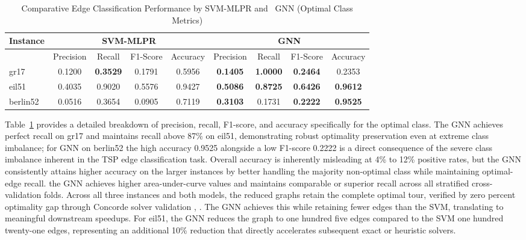 \documentclass[twoside]{article}
\begin{document}
	\begin{table}[htbp]
		\centering
		\caption{Comparative Edge Classification Performance by SVM-MLPR and \ GNN (Optimal Class Metrics)}
		\label{tab:optimal_metrics}
		\small
		\begin{tabular}{@{}l|cccc|cccc@{}}\hline
			\textbf{Instance} & \multicolumn{4}{c}{\textbf{SVM-MLPR}} & \multicolumn{4}{c}{\textbf{GNN}} \\ \hline
			& Precision & Recall & F1-Score & Accuracy & Precision & Recall & F1-Score & Accuracy \\
			gr17 & 0.1200 & \textbf{0.3529} & 0.1791 & 0.5956 & \textbf{0.1405} & \textbf{1.0000} & \textbf{0.2464} & 0.2353 \\
			eil51 & 0.4035 & 0.9020 & 0.5576 & 0.9427 & \textbf{0.5086} & \textbf{0.8725} & \textbf{0.6426} & \textbf{0.9612} \\
			berlin52 & 0.0516 & 0.3654 & 0.0905 & 0.7119 & \textbf{0.3103} & 0.1731 & \textbf{0.2222} & \textbf{0.9525} \\ \hline
		\end{tabular}
	\end{table}

	

		Table~\ref{tab:optimal_metrics} provides a detailed breakdown of precision, recall, F1-score, and accuracy specifically for the optimal class. The GNN achieves perfect recall on gr17 and maintains recall above 87\% on eil51, demonstrating robust optimality preservation even at extreme class imbalance; for GNN on berlin52 the high accuracy 0.9525 alongside a low F1-score 0.2222 is a direct consequence of the severe class imbalance inherent in the TSP edge classification task. Overall accuracy is inherently misleading at 4\% to 12\% positive rates, but the GNN consistently attains higher accuracy on the larger instances by better handling the majority non-optimal class while maintaining optimal-edge recall.  the GNN achieves higher area-under-curve values and maintains comparable or superior recall across all stratified cross-validation folds. Across all three instances and both models, the reduced graphs retain the complete optimal tour, verified by zero percent optimality gap through Concorde solver validation \cite{applegate2006traveling},  \cite{applegate2006concorde}. The GNN achieves this while retaining fewer edges than the SVM, translating to meaningful downstream speedups. For eil51, the GNN reduces the graph to one hundred five edges compared to the SVM one hundred twenty-one edges, representing an additional 10\% reduction that directly accelerates subsequent exact or heuristic solvers.  %
\end{document}
